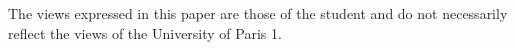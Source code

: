 The views expressed in this paper are those of the student and do not necessarily reflect the views of the University of Paris 1.

\clearpage
{}